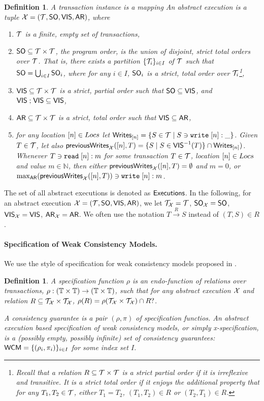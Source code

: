 \documentclass[a4paper,UKenglish]{article}%
\newtheorem{definition}[theorem]{Definition}
\theoremstyle{plain}
\begin{document}
\begin{definition}
A \emph{transaction instance} is a mapping
An abstract execution is a tuple $\mathcal{X} = (\mathcal{T}, {\sf{SO}}, {\mathsf{VIS}}, {\sf{AR}})$, where 
\begin{enumerate}
\item $\mathcal{T}$ is a finite, empty set of transactions, 
\item ${\sf{SO}} \subseteq \mathcal{T} \times \mathcal{T}$, the \emph{program order}, is the union 
of disjoint, strict total orders over $\mathcal{T}$. That is, there exists a partition $\{\mathcal{T}_i\}_{i \in I}$ 
of $\mathcal{T}$ such that ${\sf{SO}} = \bigcup_{i \in I} {\sf{SO}}_i$, where for any $i \in I$, ${\sf{SO}}_i$ is a strict, 
total order over $\mathcal{T}_i$\footnote{Recall that a relation $R \subseteq \mathcal{T} \times \mathcal{T}$ is a strict partial order 
if it is irreflexive and transitive. It is a strict total order if it enjoys the additional property that 
for any $T_1, T_2 \in \mathcal{T}$, either $T_1 = T_2$, $(T_1, T_2) \in R$ or $(T_2, T_1) \in R$.},
\item ${\mathsf{VIS}} \subseteq \mathcal{T} \times \mathcal{T}$ is a strict, partial order such that ${\sf{SO}} \subseteq {\mathsf{VIS}}$, and ${\mathsf{VIS}} \mathrel{;} {\mathsf{VIS}} \subseteq 
{\mathsf{VIS}}$,
\item ${\sf{AR}} \subseteq \mathcal{T} \times \mathcal{T}$ is a strict, total order such that ${\mathsf{VIS}} \subseteq {\sf{AR}}$,
\item for any location $[n] \in Locs$ let ${\sf{Writes}}_{[n]} = \{S \in \mathcal{T} \mid S \ni {{\tt write}}\;[n]:\_\}$. 
Given $T \in \mathcal{T}$, let also $\mathsf{previousWrites}_{\mathcal{X}}([n], T) = \{S \mid S \in {\mathsf{VIS}}^{-1}(T)\} \cap {\sf{Writes}}_{[n]})$. 
Whenever $T \ni {{\tt read}}\;[n]: m$ for some transaction $T \in \mathcal{T}$, location $[n] \in Locs$ and 
value $m \in \mathbb{N}$, then either $\mathsf{previousWrites}_{\mathcal{X}}([n], T) = \emptyset$ and $m = 0$, 
or $\max_{{\sf{AR}}}(\mathsf{previousWrites}_{\mathcal{X}}([n], T)) \ni {{\tt write}}\;[n]: m$.
\end{enumerate}
\end{definition}
The set of all abstract executions is denoted as ${\mathsf{Executions}}$.
In the following, for an abstract execution $\mathcal{X} = (\mathcal{T}, {\sf{SO}}, {\mathsf{VIS}}, {\sf{AR}})$, we let 
$\mathcal{T}_{\mathcal{X}} = \mathcal{T}$, ${\sf{SO}}_{\mathcal{X}} = {\sf{SO}}$, ${\mathsf{VIS}}_{\mathcal{X}} = {\mathsf{VIS}}$, ${\sf{AR}}_{\mathcal{X}} = {\sf{AR}}$. 
We often use the notation $T \xrightarrow{R} S$ instead of $(T,S) \in R$.

\paragraph{\textbf{Specification of Weak Consistency Models.}}
We use the style of specification for weak consistency models 
proposed in \cite{laws}. 

\begin{definition}
A specification function $\rho$ is an endo-function of relations over 
transactions, $\rho: (\mathbb{T} \times \mathbb{T}) \rightarrow (\mathbb{T} \times \mathbb{T})$,
such that for any abstract execution $\mathcal{X}$ and relation $R \subseteq \mathcal{T}_{\mathcal{X}} \times \mathcal{T}_{\mathcal{X}}$, 
$\rho(R) = \rho(\mathcal{T}_{\mathcal{X}} \times \mathcal{T}_{\mathcal{X}}) \cap R?$. 

A consistency guarantee is a pair $(\rho, \pi)$ of specification functios.
An abstract execution based specification of weak consistency models, or simply \emph{x-specification}, 
is a (possibly empty, possibly infinite) set of consistency guarantees: $\mathsf{WCM} = \{(\rho_i, \pi_i)\}_{i \in I}$ 
for some index set $I$.
\end{definition}
\end{document}
